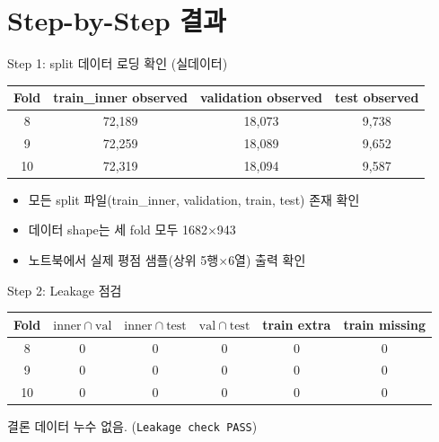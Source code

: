 \documentclass[aspectratio=169,10pt]{beamer}
\begin{document}
\section{Step-by-Step 결과}

\begin{frame}{Step 1: split 데이터 로딩 확인 (실데이터)}
  \begin{center}
  \renewcommand{\arraystretch}{1.2}
  \begin{tabular}{c|c|c|c}
    \toprule
    Fold & train\_inner observed & validation observed & test observed \\
    \midrule
    8  & 72,189 & 18,073 & 9,738 \\
    9  & 72,259 & 18,089 & 9,652 \\
    10 & 72,319 & 18,094 & 9,587 \\
    \bottomrule
  \end{tabular}
  \end{center}

  \vspace{0.4em}
  \begin{itemize}
    \item 모든 split 파일(train\_inner, validation, train, test) 존재 확인
    \item 데이터 shape는 세 fold 모두 1682\(\times\)943
    \item 노트북에서 실제 평점 샘플(상위 5행\(\times\)6열) 출력 확인
  \end{itemize}
\end{frame}

\begin{frame}{Step 2: Leakage 점검}
  \begin{center}
  \renewcommand{\arraystretch}{1.2}
  \begin{tabular}{c|c|c|c|c|c}
    \toprule
    Fold & $\mathrm{inner}\cap\mathrm{val}$ & $\mathrm{inner}\cap\mathrm{test}$ & $\mathrm{val}\cap\mathrm{test}$ & train extra & train missing \\
    \midrule
    8  & 0 & 0 & 0 & 0 & 0 \\
    9  & 0 & 0 & 0 & 0 & 0 \\
    10 & 0 & 0 & 0 & 0 & 0 \\
    \bottomrule
  \end{tabular}
  \end{center}

  \vspace{0.4em}
  \begin{alertblock}{결론}
    데이터 누수 없음. (\texttt{Leakage check PASS})
  \end{alertblock}
\end{frame}
\end{document}
